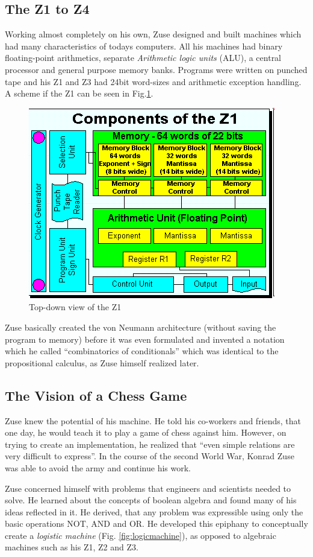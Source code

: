 \documentclass{llncs}
\begin{document}
 \subsection{The Z1 to Z4}
   Working almost completely on his own, Zuse designed and built machines 
   which had many characteristics of todays computers. All his machines
   had binary floating-point arithmetics, separate \emph{Arithmetic logic units} (ALU), 
   a central processor and general purpose memory banks.
   Programs were written on punched tape and his Z1 and Z3 had 24bit word-sizes
   and arithmetic exception handling. A scheme if the Z1 can be seen in Fig.\ref{fig:z1}.
   
  \begin{figure}[t]
    \centering
    \includegraphics[width=0.5\linewidth]{img/z1.png}
    \caption{Top-down view of the Z1\cite{epegmagHorstzuse}}
    \label{fig:z1}
  \end{figure}

   Zuse basically created the von Neumann architecture (without saving the program to memory)
   before it was even formulated\cite{epegmagHorstzuse} 
   and invented a notation which he called ``combinatorics of conditionals'' which was
   identical to the propositional calculus, as Zuse himself realized later.
 \subsection{The Vision of a Chess Game}
   Zuse knew the potential of his machine. He told his co-workers and 
   friends, that one day, he would teach it to play a game of chess 
   against him. However, on trying to create an implementation, he realized 
   that ``even simple relations are very difficult to express''. In the course
   of the second World War, Konrad Zuse was able to avoid the army and 
   continue his work. 
   
   Zuse concerned himself with problems that engineers and scientists needed to 
   solve. He learned about the concepts of boolean algebra and found many 
   of his ideas reflected in it. He derived, that any problem was expressible
   using only the basic operations NOT, AND and OR. He developed this epiphany 
   to conceptually create a \emph{logistic machine} (Fig. \ref{fig:logicmachine}), 
   as opposed to algebraic machines such as his Z1, Z2 and Z3\cite{epegmagHorstzuse}.
   
\end{document}

